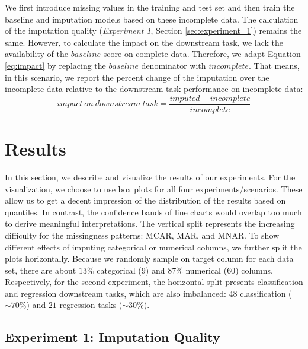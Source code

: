 \documentclass[utf8]{frontiersSCNS} %
\begin{document}
We first introduce missing values in the training and test set and then train the baseline and imputation models based on these incomplete data. The calculation of the imputation quality (\emph{Experiment 1}, Section \ref{sec:experiment_1}) remains the same. However, to calculate the impact on the downstream task, we lack the availability of the $baseline$ score on complete data. Therefore, we adapt Equation \ref{eq:impact} by replacing the $baseline$ denominator with $incomplete$. That means, in this scenario, we report the percent change of the imputation over the incomplete data relative to the downstream task performance on incomplete data:
%
\begin{equation}
	impact\ on \ downstream\ task = \frac{imputed - incomplete}{incomplete}
	\label{eq:impact_scenario2}
\end{equation}
%


\section{Results}
\label{sec:results}

In this section, we describe and visualize the results of our experiments. For the visualization, we choose to use box plots for all four experiments/scenarios. These allow us to get a decent impression of the distribution of the results based on quantiles. In contrast, the confidence bands of line charts would overlap too much to derive meaningful interpretations.  The vertical split represents the increasing difficulty for the missingness patterns: MCAR, MAR, and MNAR. To show different effects of imputing categorical or numerical columns, we further split the plots horizontally.  Because we randomly sample on target column for each data set, there are about $13\%$ categorical ($9$) and $87\%$ numerical ($60$) columns. Respectively, for the second experiment, the horizontal split presents classification and regression downstream tasks, which are also imbalanced: $48$ classification ($\sim70\%$) and $21$ regression tasks ($\sim30\%$).


\subsection{Experiment 1: Imputation Quality}
\end{document}
